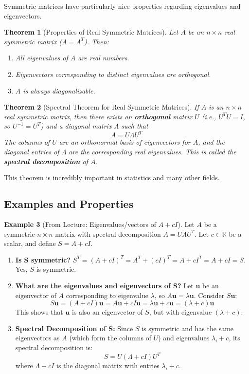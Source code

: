 \documentclass[11pt]{article}
\newtheorem{theorem}{Theorem}[section]
\theoremstyle{definition}
\newtheorem{example}[theorem]{Example}
\theoremstyle{remark}
\newcommand{\R}{\mathbb{R}}
\newcommand{\trans}{^T} %
\begin{document}
Symmetric matrices have particularly nice properties regarding eigenvalues and eigenvectors.

\begin{theorem}[Properties of Real Symmetric Matrices]
Let $A$ be an $n \times n$ real symmetric matrix ($A = A\trans$). Then:
\begin{enumerate}
    \item All eigenvalues of $A$ are real numbers.
    \item Eigenvectors corresponding to distinct eigenvalues are orthogonal.
    \item $A$ is always diagonalizable.
\end{enumerate}
\end{theorem}

\begin{theorem}[Spectral Theorem for Real Symmetric Matrices]
If $A$ is an $n \times n$ real symmetric matrix, then there exists an \textbf{orthogonal} matrix $U$ (i.e., $U\trans U = I$, so $U^{-1} = U\trans$) and a diagonal matrix $\Lambda$ such that
\[ A = U \Lambda U\trans \]
The columns of $U$ are an orthonormal basis of eigenvectors for $A$, and the diagonal entries of $\Lambda$ are the corresponding real eigenvalues. This is called the \textbf{spectral decomposition} of $A$.
\end{theorem}
This theorem is incredibly important in statistics and many other fields.

\subsection{Examples and Properties}

\begin{example}[From Lecture: Eigenvalues/vectors of $A+cI$]
Let $A$ be a symmetric $n \times n$ matrix with spectral decomposition $A = U \Lambda U\trans$. Let $c \in \R$ be a scalar, and define $S = A + cI$.
\begin{enumerate}
    \item \textbf{Is S symmetric?}
    $S\trans = (A + cI)\trans = A\trans + (cI)\trans = A + cI\trans = A + cI = S$. Yes, $S$ is symmetric.
    \item \textbf{What are the eigenvalues and eigenvectors of S?}
    Let $\mathbf{u}$ be an eigenvector of $A$ corresponding to eigenvalue $\lambda$, so $A\mathbf{u} = \lambda \mathbf{u}$. Consider $S\mathbf{u}$:
    \[ S\mathbf{u} = (A + cI)\mathbf{u} = A\mathbf{u} + cI\mathbf{u} = \lambda \mathbf{u} + c\mathbf{u} = (\lambda + c)\mathbf{u} \]
    This shows that $\mathbf{u}$ is also an eigenvector of $S$, but with eigenvalue $(\lambda + c)$.
    \item \textbf{Spectral Decomposition of S:} Since $S$ is symmetric and has the same eigenvectors as $A$ (which form the columns of $U$) and eigenvalues $\lambda_i + c$, its spectral decomposition is:
    \[ S = U (\Lambda + cI) U\trans \]
    where $\Lambda + cI$ is the diagonal matrix with entries $\lambda_i + c$.
\end{enumerate}
\end{example}
\end{document}
